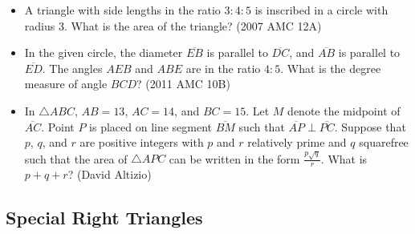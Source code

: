 \documentclass{article}
\begin{document}
\begin{itemize}
\item A triangle with side lengths in the ratio $3:4:5$ is inscribed in a circle with radius $3$. What is the area of the triangle? (2007 AMC 12A)

\item In the given circle, the diameter $\overline{EB}$ is parallel to $\overline{DC}$, and $\overline{AB}$ is parallel to $\overline{ED}$. The angles $AEB$ and $ABE$ are in the ratio $4:5$. What is the degree measure of angle $BCD$? (2011 AMC 10B)
\begin{center}
\end{center}

%
\item In $\triangle ABC$, $AB=13$, $AC=14$, and $BC=15$. Let $M$ denote the midpoint of $\overline{AC}$. Point $P$ is placed on line segment $\overline{BM}$ such that $\overline{AP}\perp\overline{PC}$. Suppose that $p$, $q$, and $r$ are positive integers with $p$ and $r$ relatively prime and $q$ squarefree such that the area of $\triangle APC$ can be written in the form $\frac{p\sqrt{q}}{r}$. What is $p+q+r$? (David Altizio)


\end{itemize}

\subsection{Special Right Triangles}
\end{document}
